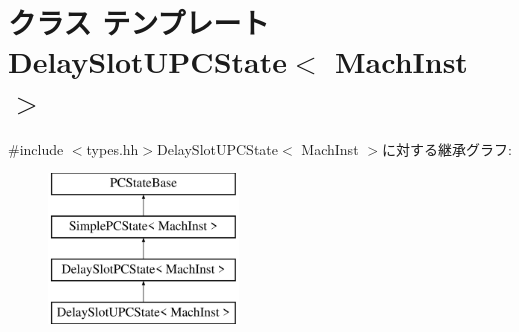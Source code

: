 \hypertarget{classGenericISA_1_1DelaySlotUPCState}{
\section{クラス テンプレート DelaySlotUPCState$<$ MachInst $>$}
\label{classGenericISA_1_1DelaySlotUPCState}
}


{\ttfamily \#include $<$types.hh$>$}DelaySlotUPCState$<$ MachInst $>$に対する継承グラフ:\begin{figure}[H]
\begin{center}
\leavevmode
\includegraphics[height=4cm]{classGenericISA_1_1DelaySlotUPCState}
\end{center}
\end{figure}
